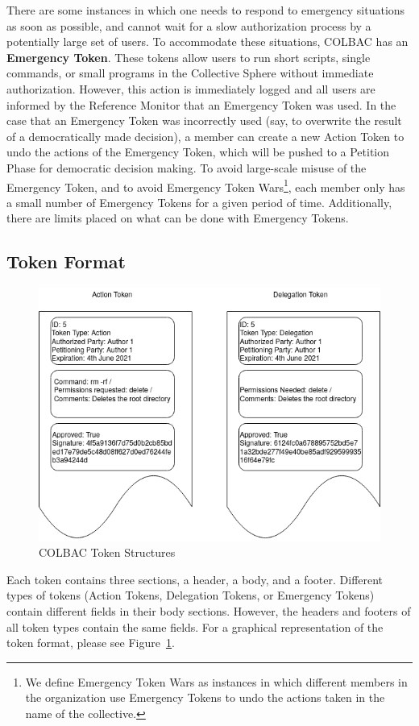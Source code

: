 There are some instances in which one needs to respond to emergency situations
as soon as possible, and cannot wait for a slow authorization process by a
potentially large set of users. To accommodate these situations, COLBAC has an
\textbf{Emergency Token}. These tokens allow users to run short scripts, single
commands, or small programs in the Collective Sphere without immediate
authorization. However, this action is immediately logged and all users are
informed by the Reference Monitor that an Emergency Token was used. In the case
that an Emergency Token was incorrectly used (say, to overwrite the result of
a democratically made decision), a member can create a new Action Token to
undo the actions of the Emergency Token, which will be pushed to a Petition
Phase for democratic decision making. To avoid large-scale misuse of the
Emergency Token, and to avoid Emergency Token Wars\footnote{We define Emergency
Token Wars as instances in which different members in the organization use
Emergency Tokens to undo the actions taken in the name of the collective.},
each member only has a small number of Emergency Tokens for a given period of
time. Additionally, there are limits placed on what can be done with Emergency
Tokens.

\subsection{Token Format}
\label{sec:Tokenformat}
\begin{figure}
\includegraphics[width=\linewidth]{figs/TokenStructures.png}
\caption{COLBAC Token Structures}
\label{fig:Tokenformatfigure}
\end{figure}
Each token contains three sections, a header, a body, and a footer. Different
types of tokens (Action Tokens, Delegation Tokens, or Emergency Tokens) contain
different fields in their body sections. However, the headers and footers of all
token types contain the same fields. For a graphical representation of the token
format, please see Figure~\ref{fig:Tokenformatfigure}.

